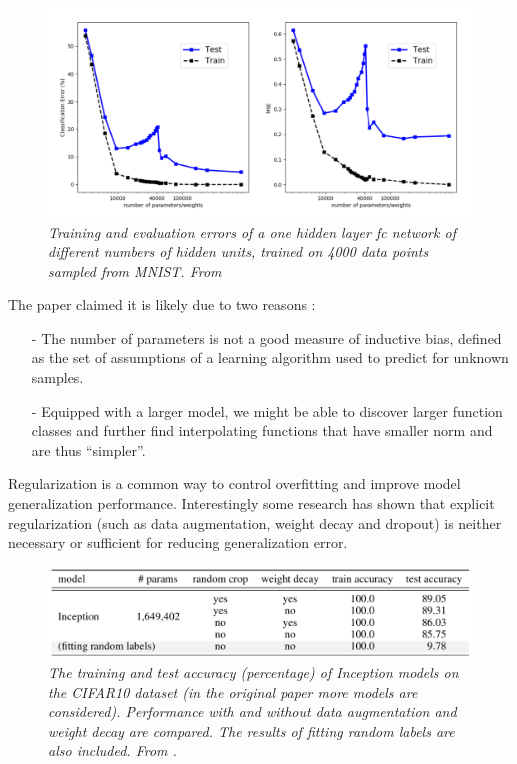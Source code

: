 \documentclass[11pt,a4paper]{article}
\begin{document}
\begin{figure}[H]
 \centering
 \includegraphics[scale=0.4]{../images/new-risk-curve-graph.png}
 \caption{\textit{Training and evaluation errors of a one hidden layer fc network of different numbers of hidden units, trained on 4000 data points sampled from MNIST. From \cite{doubleU}}}  
 \label{mnist-b-v}
\end{figure}

The paper claimed it is likely due to two reasons : 

\begin{itemize}
 \item [-] The number of parameters is not a good measure of inductive bias, defined as the set of assumptions of a learning algorithm used to predict for unknown samples.
 
 \item [-] Equipped with a larger model, we might be able to discover larger function classes and further find interpolating functions that have smaller norm and are thus “simpler”.
\end{itemize}

Regularization is a common way to control overfitting and improve model generalization performance. 
Interestingly some research \cite{rethink} has shown that explicit regularization (such as data augmentation, weight decay and dropout) is neither necessary or sufficient for reducing generalization error.

\begin{figure}[H]
 \centering
 \includegraphics[scale=0.55]{../images/table_regul.png}
 \caption{\textit{The training and test accuracy (percentage) of Inception models on the CIFAR10 dataset (in the original paper more models are considered).
  Performance with and without data augmentation and weight decay are compared. The results of fitting random labels are also included. From \cite{rethink}.}}  
 \label{table}
\end{figure}
\end{document}
